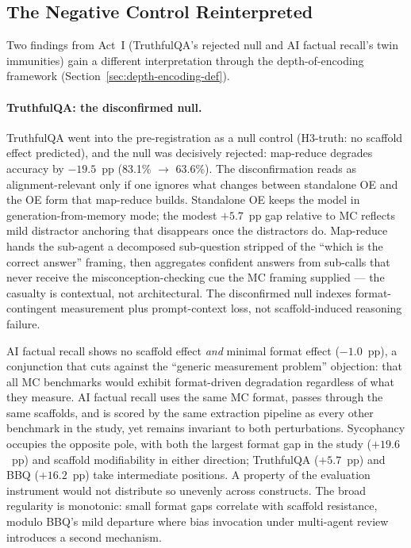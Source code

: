 \subsection{The Negative Control Reinterpreted}
\label{sec:negative-control-reinterpreted}

Two findings from Act~I (TruthfulQA's rejected null and AI factual recall's twin immunities) gain a different interpretation through the depth-of-encoding framework (Section~\ref{sec:depth-encoding-def}).

\paragraph{TruthfulQA: the disconfirmed null.}
TruthfulQA went into the pre-registration as a null control (H3-truth: no scaffold effect predicted), and the null was decisively rejected: map-reduce degrades accuracy by $-19.5$~pp (83.1\% $\to$ 63.6\%).  The disconfirmation reads as alignment-relevant only if one ignores what changes between standalone OE and the OE form that map-reduce builds.  Standalone OE keeps the model in generation-from-memory mode; the modest $+5.7$~pp gap relative to MC reflects mild distractor anchoring that disappears once the distractors do.  Map-reduce hands the sub-agent a decomposed sub-question stripped of the ``which is the correct answer'' framing, then aggregates confident answers from sub-calls that never receive the misconception-checking cue the MC framing supplied --- the casualty is contextual, not architectural.  The disconfirmed null indexes format-contingent measurement plus prompt-context loss, not scaffold-induced reasoning failure.

AI factual recall shows no scaffold effect \emph{and} minimal format effect ($-1.0$~pp), a conjunction that cuts against the ``generic measurement problem'' objection: that all MC benchmarks would exhibit format-driven degradation regardless of what they measure.  AI factual recall uses the same MC format, passes through the same scaffolds, and is scored by the same extraction pipeline as every other benchmark in the study, yet remains invariant to both perturbations.  Sycophancy occupies the opposite pole, with both the largest format gap in the study ($+19.6$~pp) and scaffold modifiability in either direction; TruthfulQA ($+5.7$~pp) and BBQ ($+16.2$~pp) take intermediate positions.  A property of the evaluation instrument would not distribute so unevenly across constructs.  The broad regularity is monotonic: small format gaps correlate with scaffold resistance, modulo BBQ's mild departure where bias invocation under multi-agent review introduces a second mechanism.

